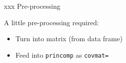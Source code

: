 \documentclass[ignorenonframetext,]{beamer}
\newenvironment{Shaded}{\begin{snugshade}}{\end{snugshade}}
\newcommand{\DataTypeTok}[1]{\textcolor[rgb]{0.13,0.29,0.53}{#1}}
\newcommand{\KeywordTok}[1]{\textcolor[rgb]{0.13,0.29,0.53}{\textbf{#1}}}
\newcommand{\NormalTok}[1]{#1}
\newcommand{\OperatorTok}[1]{\textcolor[rgb]{0.81,0.36,0.00}{\textbf{#1}}}
\newcommand{\StringTok}[1]{\textcolor[rgb]{0.31,0.60,0.02}{#1}}
\begin{document}
\begin{frame}[fragile]{xxx Pre-processing}
\protect\hypertarget{xxx-pre-processing}{}

A little pre-processing required:

\begin{itemize}
\item
  Turn into matrix (from data frame)
\item
  Feed into \texttt{princomp} as \texttt{covmat=}
\end{itemize}

\begin{Shaded}
\end{Shaded}

\end{frame}
\end{document}
